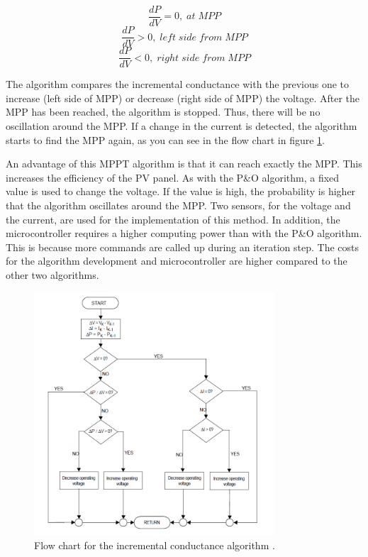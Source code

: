 \begin{equation} \label{Inccond1}
\frac{dP}{dV} = 0 ,\; at\; MPP 
\end{equation} 
\begin{equation} \label{Inccond2}
\frac{dP}{dV} > 0 ,\; left\; side\; from\; MPP 
\end{equation}
\begin{equation} \label{Inccond3}
\frac{dP}{dV} < 0 ,\; right\; side\; from\; MPP
\end{equation}

The algorithm compares the incremental conductance with the previous one to increase (left side of MPP) or decrease (right side of MPP) the voltage. After the MPP has been reached, the algorithm is stopped. Thus, there will be no oscillation around the MPP. If a change in the current is detected, the algorithm starts to find the MPP again, as you can see in the flow chart in figure \ref{fcinccon}. \cite{AN1521_MC}

An advantage of this MPPT algorithm is that it can reach exactly the MPP. This increases the efficiency of the PV panel. As with the P\&O algorithm, a fixed value is used to change the voltage. If the value is high, the probability is higher that the algorithm oscillates around the MPP. 
Two sensors, for the voltage and the current, are used for the implementation of this method. In addition, the microcontroller requires a higher computing power than with the P\&O algorithm. This is because more commands are called up during an iteration step. The costs for the algorithm development and microcontroller are higher compared to the other two algorithms. \cite{AN1521_MC}

\begin{figure}[H]
	\begin{center}
		\includegraphics[width=0.8\textwidth]{../Pictures/P1/Flow_chart/flow_chart_incremental_conductance}
		\caption{Flow chart for the incremental conductance algorithm \cite{AN1521_MC}.}
		\label{fcinccon}
	\end{center}	
\end{figure}


